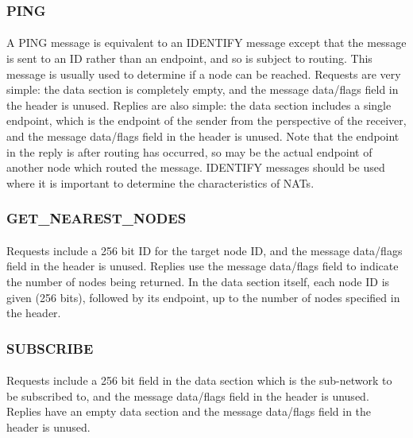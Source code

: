 \documentclass{article}
\begin{document}
\subsubsection{PING}

\paragraph{}
A PING message is equivalent to an IDENTIFY message except that the message is sent to an ID rather than an endpoint, and so is subject to routing. This message is usually used to determine if a node can be reached.
Requests are very simple: the data section is completely empty, and the message data/flags field in the header is unused.
Replies are also simple: the data section includes a single endpoint, which is the endpoint of the sender from the perspective of the receiver, and the message data/flags field in the header is unused.
Note that the endpoint in the reply is after routing has occurred, so may be the actual endpoint of another node which routed the message. IDENTIFY messages should be used where it is important to determine the characteristics of NATs.

\subsubsection{GET_NEAREST_NODES}

\paragraph{}
Requests include a 256 bit ID for the target node ID, and the message data/flags field in the header is unused.
Replies use the message data/flags field to indicate the number of nodes being returned. In the data section itself, each node ID is given (256 bits), followed by its endpoint, up to the number of nodes specified in the header.

\subsubsection{SUBSCRIBE}

\paragraph{}
Requests include a 256 bit field in the data section which is the sub-network to be subscribed to, and the message data/flags field in the header is unused.
Replies have an empty data section and the message data/flags field in the header is unused.
\end{document}
